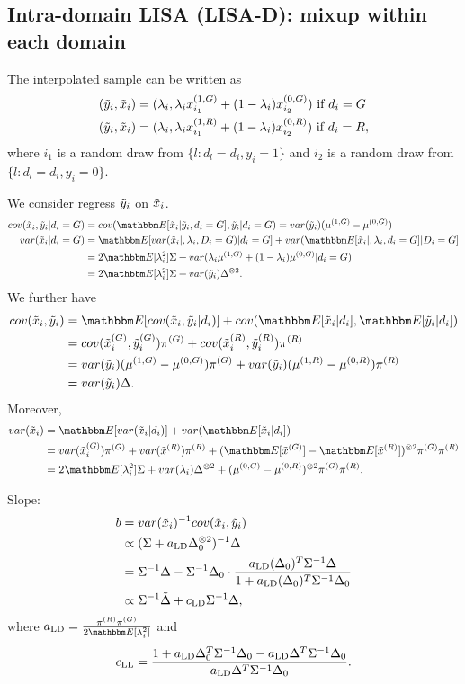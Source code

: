 \subsection{Intra-domain LISA (LISA-D): mixup within each domain}

The interpolated sample can be written as
\begin{align*}
  &(\tilde{y}_i,\tilde{x}_i)=(\lambda_i,\lambda_ix_{i_1}^{(1,G)}+(1-\lambda_i)x_{i_2}^{(0,G)}) ~\text{if}~d_i=G\\
&(\tilde{y}_i,\tilde{x}_i)=(\lambda_i,\lambda_ix_{i_1}^{(1,R)}+(1-\lambda_i)x_{i_2}^{(0,R)}) ~\text{if}~d_i=R,
\end{align*}
where $i_1$ is a random draw from $\{l: d_l=d_i,y_i=1\}$ and $i_2$ is a random draw from $\{l: d_l=d_i,y_i=0\}$.

We consider regress $\tilde{y}_i$ on $\tilde{x}_i$. 
\begin{align*}
cov(\tx_i,\ty_i|d_i=G)&=cov(\E[\tx_i|\ty_i,d_i=G],\ty_i|d_i=G)=var(\ty_i)(\mu^{(1,G)}-\mu^{(0,G)})\\
var(\tx_i|d_i=G)&=\E[var(\tx_i|,\lam_i,D_i=G)|d_i=G]+var(\E[\tx_i|,\lam_i,d_i=G]|D_i=G]\\
&=2\E[\lam_i^2]\Sig+var(\lam_i\mu^{(1,G)}+(1-\lam_i)\mu^{(0,G)}|d_i=G)\\
&=2\E[\lam_i^2]\Sig+var(\ty_i)\Delta^{\otimes 2}.
\end{align*}
We further have
\begin{align*}
    cov(\tx_i,\ty_i)&=\E[cov(\tx_i,\ty_i|d_i)]+cov(\E[\tx_i|d_i],\E[\ty_i|d_i])\\
&=cov(\tx_i^{(G)},\ty_i^{(G)})\pi^{(G)}+cov(\tx_i^{(R)},\ty_i^{(R)})\pi^{(R)}\\
&=var(\ty_i)(\mu^{(1,G)}-\mu^{(0,G)})\pi^{(G)}+var(\ty_i)(\mu^{(1,R)}-\mu^{(0,R)})\pi^{(R)}\\
&=var(\ty_i)\Delta.
\end{align*}
Moreover,
\begin{align*}
    var(\tx_i)&=\E[var(\tx_i|d_i)]+var(\E[\tx_i|d_i])\\
    &=var(\tx_i^{(G)})\pi^{(G)}+var(\tx^{(R)})\pi^{(R)}+(\E[\tx^{(G)}]-\E[\tx^{(R)}])^{\otimes 2}\pi^{(G)}\pi^{(R)}\\
    &=2\E[\lam_i^2]\Sig+var(\lam_i)\Delta^{\otimes 2}+(\mu^{(0,G)}-\mu^{(0,R)})^{\otimes 2}\pi^{(G)}\pi^{(R)}.
\end{align*}


Slope:
\begin{align*}
    b&=var(\tilde{x}_i)^{-1}cov(\tilde{x}_i,\tilde{y}_i)\\
    &\propto (\Sigma+a_{\textup{LD}}\Delta_0^{\otimes 2})^{-1}\Delta\\
    &=\Sigma^{-1}\Delta-\Sigma^{-1}\Delta_0\cdot\frac{a_{\textup{LD}}(\Delta_0)^T\Sigma^{-1}\Delta}{1+a_{\textup{LD}}(\Delta_0)^T\Sigma^{-1}\Delta_0}\\
    &\propto \Sigma^{-1}\tilde{\Delta}+c_{\textup{LD}}\Sigma^{-1}\Delta,
\end{align*}
where $a_{\textup{LD}}=\frac{\pi^{(R)}\pi^{(G)}}{2\E[\lam_i^2]}$ and 
 \[
    c_{\textup{LL}}=\frac{1+a_{\textup{LD}}\Delta_0^T\Sigma^{-1}\Delta_0-a_{\textup{LD}}\Delta^T\Sigma^{-1}\Delta_0}{a_{\textup{LD}}\Delta^T\Sigma^{-1}\Delta_0}.
 \]

